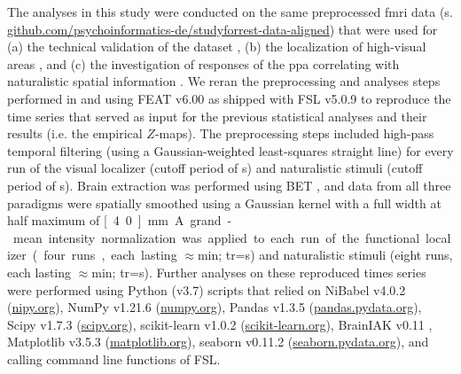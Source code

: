 The analyses in this study were conducted on the same preprocessed \ac{fmri}
data (s.
\href{https://github.com/psychoinformatics-de/studyforrest-data-aligned
}{\url{github.com/psychoinformatics-de/studyforrest-data-aligned}}) that were
used for
%
(a) the technical validation of the dataset \citep{hanke2016simultaneous},
%
(b) the localization of high-visual areas \citep{sengupta2016extension}, and
%
(c) the investigation of responses of the \ac{ppa} correlating with naturalistic
spatial information \citep{haeusler2022processing}.
%
We reran the preprocessing and analyses steps performed in
\citet{sengupta2016extension} and \citet{haeusler2022processing} using FEAT
v6.00 \citep[FMRI Expert Analysis Tool;][]{woolrich2001autocorr} as shipped with
FSL v5.0.9 \citep[\href{https://www.fmrib.ox.ac.uk/fsl}{FMRIB's Software
Library;}][]{smith2004fsl} to reproduce the time series that served as input for
the previous statistical analyses and their results (i.e. the empirical
$Z$-maps).
The preprocessing steps included high-pass temporal filtering (using a
Gaussian-weighted least-squares straight line) for every run of the visual
localizer (cutoff period of \unit[100]{s}) and naturalistic stimuli (cutoff
period of \unit[150]{s}).
Brain extraction was performed using BET \citep{smith2002bet}, and data from all
three paradigms were spatially smoothed using a Gaussian kernel with a full
width at half maximum of \unit[4.0]{mm}.
A grand-mean intensity normalization was applied to each run of the functional
localizer (four runs, each lasting $\approx$\unit[5]{min}; \ac{tr}=\unit[2]{s})
and naturalistic stimuli (eight runs, each lasting $\approx$\unit[15]{min};
\ac{tr}=\unit[2]{s}).
%
Further analyses on these reproduced times series were performed using Python
(v3.7) scripts that relied on
%
NiBabel v4.0.2 (\href{https://nipy.org}{\url{nipy.org}}),
%
NumPy v1.21.6 (\href{https://numpy.org}{\url{numpy.org}}),
%
Pandas v1.3.5 (\href{https://pandas.pydata.org}{\url{pandas.pydata.org}}),
%
Scipy v1.7.3 (\href{https://scipy.org}{\url{scipy.org}}),
%
scikit-learn v1.0.2 (\href{https://scikit-learn.org}{\url{scikit-learn.org}}),
%
BrainIAK v0.11
\citep[\href{https://brainiak.org}{\url{brainiak.org}}][]{kumar2020brainiak,
kumar2020brainiaktutorial},
%
Matplotlib v3.5.3 (\href{https://matplotlib.org}{\url{matplotlib.org}}),
%
seaborn v0.11.2 (\href{https://seaborn.pydata.org}{\url{seaborn.pydata.org}}),
%
and calling command line functions of FSL.

